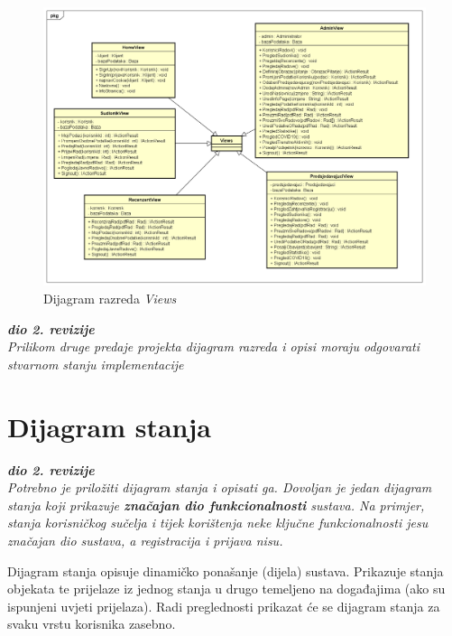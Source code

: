 				\newpage

				\begin{figure}[H]
					\includegraphics[width= 15 cm, keepaspectratio]{dijagrami/DijagramRazredaViews.png} 
					\centering
					\caption{Dijagram razreda \textit{Views} }
					\label{fig:DijagramViews}
				\end{figure}
				
			
			\textbf{\textit{dio 2. revizije}}\\			
			
			\textit{Prilikom druge predaje projekta dijagram razreda i opisi moraju odgovarati stvarnom stanju implementacije}
			
			
			
			\eject
		
		\section{Dijagram stanja}
			
			
			\textbf{\textit{dio 2. revizije}}\\
			
			\textit{Potrebno je priložiti dijagram stanja i opisati ga. Dovoljan je jedan dijagram stanja koji prikazuje \textbf{značajan dio funkcionalnosti} sustava. Na primjer, stanja korisničkog sučelja i tijek korištenja neke ključne funkcionalnosti jesu značajan dio sustava, a registracija i prijava nisu. }
			
			Dijagram stanja opisuje dinamičko ponašanje (dijela) sustava. Prikazuje stanja objekata te prijelaze iz jednog stanja u drugo temeljeno na događajima (ako su ispunjeni uvjeti prijelaza).
			Radi preglednosti prikazat će se dijagram stanja za svaku vrstu korisnika zasebno.
			
